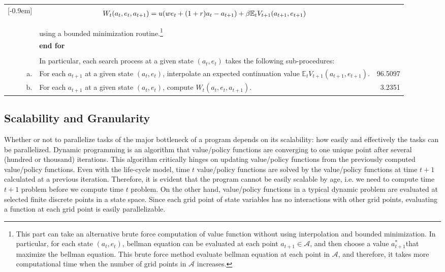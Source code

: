 \documentclass[12pt]{article}
\begin{document}
\begin{table}[h!]
\begin{tabular}{r p{12cm} r}
[-0.9em]
&\parbox{4cm}{
\begin{align}
W_t(a_{t},e_t,a_{t+1}) = u(w e_t + (1+r)a_t - a_{t+1}) + \beta \mathbb{E}_t V_{t+1}(a_{t+1},e_{t+1}) \notag
\end{align}} \\
[-0.5em]
& \hspace{2em}using a bounded minimization routine.\footnote{This part can take an alternative brute force computation of value function without using interpolation and bounded minimization. In particular, for each state $(a_t,e_t)$, bellman equation can be evaluated at each point $a_{t+1}\in\mathcal{A}$, and then choose a value $a^*_{t+1}$that maximize the bellman equation. This brute force method evaluate bellman equation at each point in $\mathcal{A}$, and therefore, it takes more computational time when the number of grid points in $\mathcal{A}$ increases.} \\
&  \textbf{end for}\\
&\\
& In particular, each search process at a given state $(a_{t},e_{t})$ takes the following sub-procedures:\\
		a.& For each $a_{t+1}$ at a given state $(a_t,e_t)$, interpolate an expected continuation value $\mathbb{E}_t V_{t+1}(a_{t+1},e_{t+1})$. & 96.5097\\
		b.& For each $a_{t+1}$ at a given state $(a_t,e_t)$, compute $W_t(a_{t},e_t,a_{t+1})$. &3.2351\\
\hline
\end{tabular}
\end{table}

\subsection{Scalability and Granularity}
Whether or not to parallelize tasks of the major bottleneck of a program depends on its scalability: how easily and effectively the tasks can be parallelized. Dynamic programming is an algorithm that value/policy functions are converging to one unique point after several (hundred or thousand) iterations. This algorithm critically hinges on updating value/policy functions from the previously computed value/policy functions. Even with the life-cycle model, time $t$ value/policy functions are solved by the value/policy functions at time $t+1$ calculated at a previous iteration. Therefore, it is evident that the program cannot be easily scalable by age, i.e. we need to compute time $t+1$ problem before we compute time $t$ problem. On the other hand, value/policy functions in a typical dynamic problem are evaluated at selected finite discrete points in a state space. Since each grid point of state variables has no interactions with other grid points, evaluating a function at each grid point is easily parallelizable. 
\end{document}
